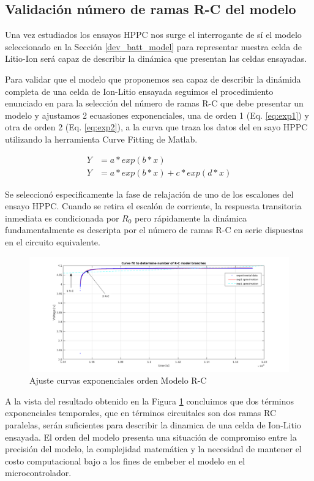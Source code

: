 \documentclass[10pt, a4paper]{report}
\begin{document}
\subsection{Validación número de ramas R-C del modelo}

Una vez estudiados los ensayos \acrshort{HPPC} nos surge el interrogante de sí el
modelo seleccionado en la Sección \ref{dev_batt_model} para representar nuestra
celda de Litio-Ion será capaz de describir la dinámica que presentan las celdas
ensayadas. 

Para validar que el modelo que proponemos sea capaz de describir la dinámida
completa de una celda de Ion-Litio ensayada seguimos el procedimiento enunciado
en \cite{Jackey2013BatteryMP} para la selección del número de ramas R-C
que debe presentar un modelo y ajustamos 2 ecuasiones exponenciales, una de
orden 1 (Eq. \ref{eq:exp1}) y otra de orden 2 (Eq.  \ref{eq:exp2}), a la curva
que traza los datos del en sayo HPPC utilizando la herramienta Curve Fitting de
Matlab.

\begin{align}
    Y &= a*exp(b*x)\label{eq:exp1}\\
    Y &= a*exp(b*x)+c*exp(d*x)\label{eq:exp2}
\end{align}

Se seleccion\'o especificamente la fase de relajación de uno de los escalones
del ensayo \acrshort{HPPC}. Cuando se retira el escalón de corriente, la
respuesta transitoria inmediata es condicionada por $R_{0}$ pero r\'apidamente
la din\'amica fundamentalmente es descripta por el número de ramas R-C en serie
dispuestas en el circuito equivalente. 

\begin{figure}[h!]
    \begin{center}
        \includegraphics[width=.65\textwidth]{rc_model_fit.png}
        \caption{Ajuste curvas exponenciales orden Modelo R-C}
        \label{fig:model_fit}
    \end{center}
\end{figure}
\FloatBarrier

A la vista del resultado obtenido en la Figura \ref{fig:model_fit} concluimos
que dos t\'erminos exponenciales temporales, que en términos circuitales son dos
ramas RC paralelas, serán suficientes para describir la dinamica de una celda de
Ion-Litio ensayada. El orden del modelo presenta una situación de compromiso
entre la precisión del modelo, la complejidad matemática y la necesidad de
mantener el costo computacional bajo a los fines de embeber el modelo en el
microcontrolador. 
\end{document}
